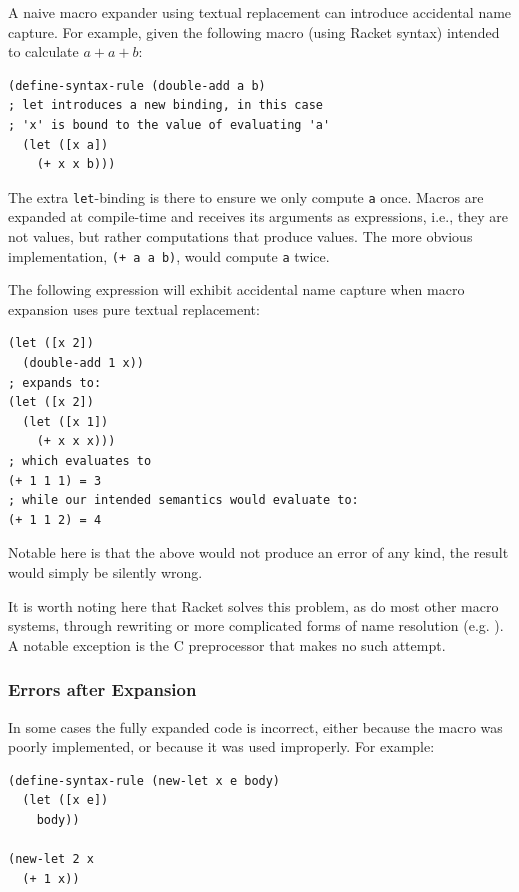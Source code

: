 \documentclass{kththesis}
\begin{document}
A naive macro expander using textual replacement can introduce accidental name capture. For example, given the following macro (using Racket syntax) intended to calculate $a + a + b$:

\begin{verbatim}
(define-syntax-rule (double-add a b)
; let introduces a new binding, in this case
; 'x' is bound to the value of evaluating 'a'
  (let ([x a])
    (+ x x b)))
\end{verbatim}

The extra \texttt{let}-binding is there to ensure we only compute \texttt{a} once. Macros are expanded at compile-time and receives its arguments as expressions, i.e., they are not values, but rather computations that produce values. The more obvious implementation, \texttt{(+ a a b)}, would
compute \texttt{a} twice.

The following expression will exhibit accidental name capture when macro expansion uses pure textual replacement:

\begin{verbatim}
(let ([x 2])
  (double-add 1 x))
; expands to:
(let ([x 2])
  (let ([x 1])
    (+ x x x)))
; which evaluates to
(+ 1 1 1) = 3
; while our intended semantics would evaluate to:
(+ 1 1 2) = 4
\end{verbatim}

Notable here is that the above would not produce an error of any kind, the result would simply be silently wrong.

It is worth noting here that Racket solves this problem, as do most other macro systems, through rewriting or more complicated forms of name resolution (e.g. \cite{FLATT2012Macros-that-Wor,Flatt2016Binding-As-Sets}). A notable exception is the C preprocessor that makes no such attempt.

\subsubsection{Errors after Expansion}

In some cases the fully expanded code is incorrect, either because the macro was poorly implemented, or because it was used improperly. For example:

\begin{verbatim}
(define-syntax-rule (new-let x e body)
  (let ([x e])
    body))

(new-let 2 x
  (+ 1 x))
\end{verbatim}
\end{document}
